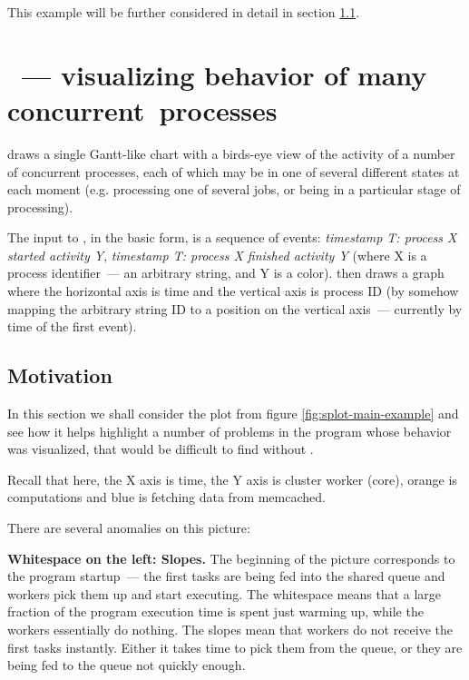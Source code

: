\documentclass{article}
\begin{document}
This example will be further considered in detail in section \ref{sec:splot-motivation}.

\section{\splot{} ~--- visualizing behavior of many \mbox{concurrent processes}}

\splot{} draws a single Gantt-like chart with a birds-eye view of the activity of a number of concurrent processes, each of which may be in one of several different states at each moment (e.g. processing one of several jobs, or being in a particular stage of processing). 

The input to \splot{}, in the basic form, is a sequence of events: \emph{timestamp T: process X started activity Y}, \emph{timestamp T: process X finished activity Y} (where X is a process identifier~--- an arbitrary string, and Y is a color). \splot{} then draws a graph where the horizontal axis is time and the vertical axis is process ID (by somehow mapping the arbitrary string ID to a position on the vertical axis~--- currently by time of the first event).

\subsection{Motivation}
\label{sec:splot-motivation}
In this section we shall consider the plot from figure \ref{fig:splot-main-example} and see how it helps highlight a number of problems in the program whose behavior was visualized, that would be difficult to find without \splot{}.

Recall that here, the X axis is time, the Y axis is cluster worker (core), orange is computations and blue is fetching data from memcached.

There are several anomalies on this picture:

\vspace{3mm}

\textbf{Whitespace on the left: Slopes.} The beginning of the picture corresponds to the program startup~--- the first tasks are being fed into the shared queue and workers pick them up and start executing. The whitespace means that a large fraction of the program execution time is spent just warming up, while the workers essentially do nothing. The slopes mean that workers do not receive the first tasks instantly. Either it takes time to pick them from the queue, or they are being fed to the queue not quickly enough.
\end{document}

